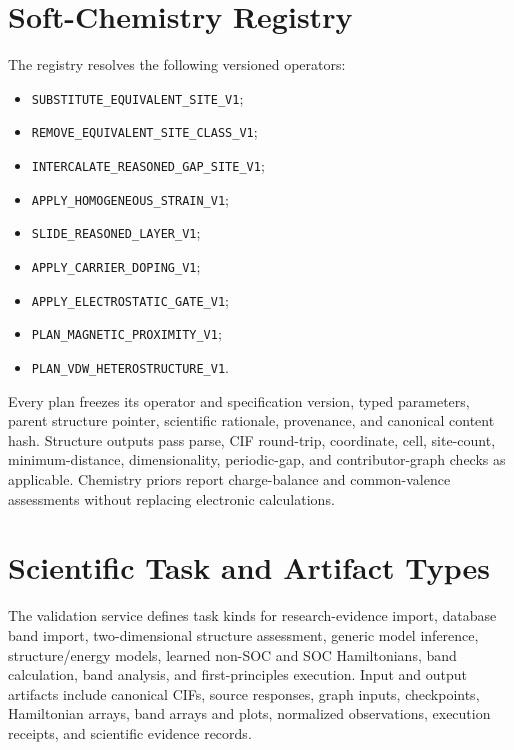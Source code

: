 \section{Soft-Chemistry Registry}
\label{app:softchem}

The registry resolves the following versioned operators:

\begin{itemize}
    \item \texttt{SUBSTITUTE\_EQUIVALENT\_SITE\_V1};
    \item \texttt{REMOVE\_EQUIVALENT\_SITE\_CLASS\_V1};
    \item \texttt{INTERCALATE\_REASONED\_GAP\_SITE\_V1};
    \item \texttt{APPLY\_HOMOGENEOUS\_STRAIN\_V1};
    \item \texttt{SLIDE\_REASONED\_LAYER\_V1};
    \item \texttt{APPLY\_CARRIER\_DOPING\_V1};
    \item \texttt{APPLY\_ELECTROSTATIC\_GATE\_V1};
    \item \texttt{PLAN\_MAGNETIC\_PROXIMITY\_V1};
    \item \texttt{PLAN\_VDW\_HETEROSTRUCTURE\_V1}.
\end{itemize}

Every plan freezes its operator and specification version, typed parameters, parent structure pointer, scientific rationale, provenance, and canonical content hash.  Structure outputs pass parse, CIF round-trip, coordinate, cell, site-count, minimum-distance, dimensionality, periodic-gap, and contributor-graph checks as applicable.  Chemistry priors report charge-balance and common-valence assessments without replacing electronic calculations.

\section{Scientific Task and Artifact Types}
\label{app:tasks}

The validation service defines task kinds for research-evidence import, database band import, two-dimensional structure assessment, generic model inference, structure/energy models, learned non-SOC and SOC Hamiltonians, band calculation, band analysis, and first-principles execution.  Input and output artifacts include canonical CIFs, source responses, graph inputs, checkpoints, Hamiltonian arrays, band arrays and plots, normalized observations, execution receipts, and scientific evidence records.

